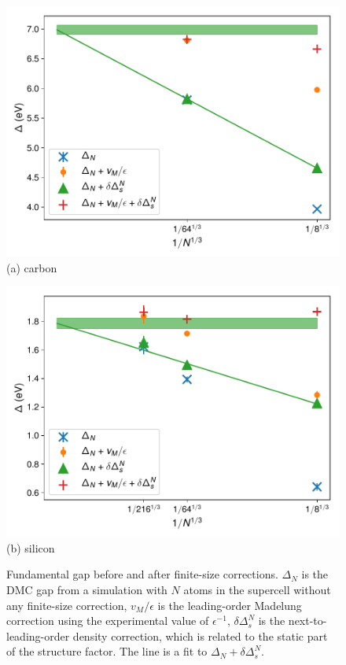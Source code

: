 \begin{figure}
\begin{minipage}{\columnwidth}
\includegraphics[width=\columnwidth]{si35f_nofold-c-nodvs-gap-extrap}
(a) carbon
\end{minipage}
\begin{minipage}{\columnwidth}
\includegraphics[width=\columnwidth]{si35f_nofold-si-nodvs-gap-extrap}
(b) silicon
\end{minipage}
\caption{Fundamental gap before and after finite-size corrections. $\Delta_N$ is the DMC gap from a simulation with $N$ atoms in the supercell without any finite-size correction, $v_M/\epsilon$ is the leading-order Madelung correction using the experimental value of $\epsilon^{-1}$,
$\delta\Delta^N_s$ is the next-to-leading-order density correction, which is related to the static part of the structure factor. The line is a fit to $\Delta_N + \delta\Delta^N_s$. \label{fig:gap-extrap}}
\end{figure}

